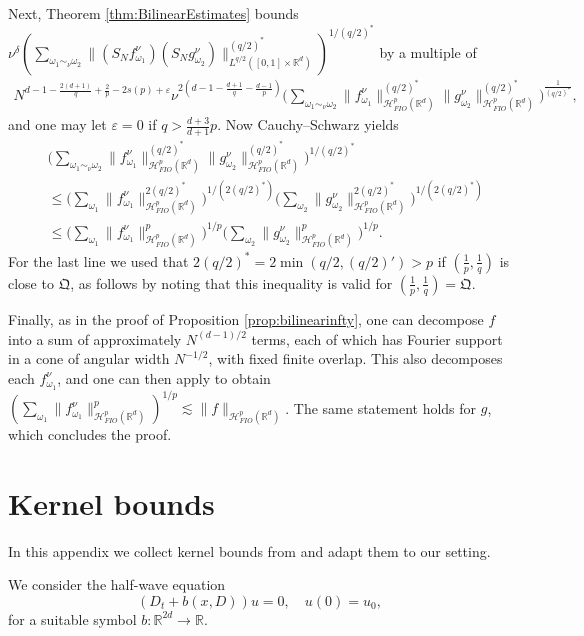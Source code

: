\documentclass{amsart}
\numberwithin{equation}{section}
\theoremstyle{definition}
\newcommand{\R}{\mathbb{R}}
\newcommand{\Rd}{\mathbb{R}^{d}}
\newcommand {\Hp}{\mathcal{H}^{p}_{FIO}(\R^d)}
\newcommand {\veps}{\varepsilon}
\newcommand {\w}{\omega}
\begin{document}
Next, %
Theorem \ref{thm:BilinearEstimates} bounds $\nu^{\delta}(\sum_{\w_{1}\sim_{\nu}\w_{2}}\|(S_{N}f^{\nu}_{\w_{1}})(S_{N}g^{\nu}_{\w_{2}})\|_{L^{q/2}([0,1]\times\Rd)}^{(q/2)^{*}})^{1/(q/2)^{*}}$ by a multiple of
\begin{align*}
N^{d-1-\frac{2(d+1)}{q}+\frac{2}{p}-2s(p)+\veps}\nu^{2(d-1-\frac{d+1}{q}-\frac{d-1}{p})}\!\Big(\!\sum_{\w_{1}\sim_{\nu}\w_{2}}\!\|f^{\nu}_{\w_{1}}\|_{\Hp}^{(q/2)^{*}}\|g^{\nu}_{\w_{2}}\|_{\Hp}^{(q/2)^{*}}\Big)^{\frac{1}{(q/2)^{*}}},
\end{align*}
and one may let $\veps=0$ if $q>\frac{d+3}{d+1}p$. Now Cauchy--Schwarz yields
\begin{align*}
&\Big(\sum_{\w_{1}\sim_{\nu}\w_{2}}\|f^{\nu}_{\w_{1}}\|_{\Hp}^{(q/2)^{*}}\|g^{\nu}_{\w_{2}}\|_{\Hp}^{(q/2)^{*}}\Big)^{1/(q/2)^{*}}\\
&\leq \Big(\sum_{\w_{1}}\|f^{\nu}_{\w_{1}}\|_{\Hp}^{2(q/2)^{*}}\Big)^{1/(2(q/2)^{*})}\Big(\sum_{\w_{2}}\|g^{\nu}_{\w_{2}}\|_{\Hp}^{2(q/2)^{*}}\Big)^{1/(2(q/2)^{*})}\\
&\leq \Big(\sum_{\w_{1}}\|f^{\nu}_{\w_{1}}\|_{\Hp}^{p}\Big)^{1/p}\Big(\sum_{\w_{2}}\|g^{\nu}_{\w_{2}}\|_{\Hp}^{p}\Big)^{1/p}.
\end{align*}
For the last line we used that $2(q/2)^{*}=2\min(q/2,(q/2)')>p$ if $(\frac{1}{p},\frac{1}{q})$ is close to $\mathfrak{Q}$, as follows by noting that this inequality is valid for $(\frac{1}{p},\frac{1}{q})=\mathfrak{Q}$.

Finally, as in the proof of Proposition \ref{prop:bilinearinfty}, one can decompose $f$ into a sum of approximately $N^{(d-1)/2}$ terms, each of which has Fourier support in a cone of angular width $N^{-1/2}$, with fixed finite overlap. This also decomposes each $f^{\nu}_{\w_{1}}$, and one can then apply \cite[Proposition 7.1]{HaPoRoYu26} to obtain $(\sum_{\w_{1}}\|f^{\nu}_{\w_{1}}\|_{\Hp}^{p})^{1/p}\lesssim \|f\|_{\Hp}$. The same statement holds for $g$, which concludes the proof.


\appendix

\section{Kernel bounds}\label{sec:kernel}

In this appendix we collect kernel bounds from \cite{GebaTataru2007} and adapt them to our setting. 

We consider the half-wave equation 
\begin{equation}
    \label{eq:EvolutionEquationGT}
        (D_t + b(x,D)) u= 0, \quad u(0) = u_0,
\end{equation}
for a suitable symbol $b:\R^{2d}\to \R$.  
\end{document}

